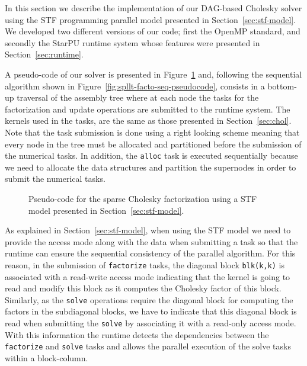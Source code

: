 \documentclass{article}
\begin{document}

In this section we describe the implementation of our DAG-based
Cholesky solver using the STF programming parallel model presented in
Section~\ref{sec:stf-model}. We developed two different versions of our
code; first the OpenMP standard, and secondly the StarPU runtime
system whose features were presented in Section~\ref{sec:runtime}.

A pseudo-code of our solver is presented in
Figure~\ref{fig:spllt-facto-pseudocode} and, following the sequential
algorithm shown in Figure~\ref{fig:spllt-facto-seq-pseudocode},
consists in a bottom-up traversal of the assembly tree where at each
node the tasks for the factorization and update operations are
submitted to the runtime system. The kernels used in the tasks, are
the same as those presented in Section~\ref{sec:chol}. Note that
the task submission is done using a right looking scheme meaning
that every node in the tree must be allocated and partitioned before
the submission of the numerical tasks. In addition, the \texttt{alloc}
task is executed sequentially because we need to allocate the data
structures and partition the supernodes in order to submit the
numerical tasks.

\begin{figure}[!h]
  \centering 
  \caption{\label{fig:spllt-facto-pseudocode}Pseudo-code for the sparse
    Cholesky factorization using a STF model presented in
    Section~\ref{sec:stf-model}.}
\end{figure}

As explained in Section~\ref{sec:stf-model}, when using the STF model
we need to provide the access mode along with the data when submitting
a task so that the runtime can ensure the sequential consistency of
the parallel algorithm. For this reason, in the submission of
\texttt{factorize} tasks, the diagonal block \texttt{blk(k,k)} is
associated with a read-write access mode indicating that the kernel is
going to read and modify this block as it computes the Cholesky factor
of this block. Similarly, as the \texttt{solve} operations require the
diagonal block for computing the factors in the subdiagonal blocks, we
have to indicate that this diagonal block is read when submitting the
\texttt{solve} by associating it with a read-only access mode. With
this information the runtime detects the dependencies between the
\texttt{factorize} and \texttt{solve} tasks and allows the parallel
execution of the solve tasks within a block-column. 
\end{document}
